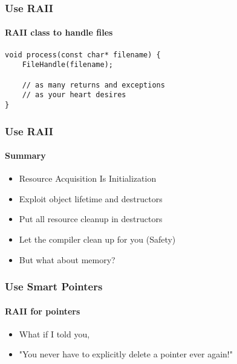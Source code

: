 \begin{frame}[fragile]
    \frametitle{\declarerule Use RAII}
    \framesubtitle{RAII class to handle files}
    \begin{lstlisting}[title=Problems begone!]
void process(const char* filename) {
    FileHandle(filename);

    // as many returns and exceptions
    // as your heart desires
}
    \end{lstlisting}
\end{frame}

\begin{frame}
    \frametitle{\declarerule Use RAII}
    \framesubtitle{Summary}
    \begin{itemize}
        \item<1->Resource Acquisition Is Initialization 
        \item<1->Exploit object lifetime and destructors
        \item<1->Put all resource cleanup in destructors
        \item<1->Let the compiler clean up for you (\alert{Safety})
        \item<2->But what about memory?
    \end{itemize}
\end{frame}


\begin{frame}
    \frametitle{\declarerule Use Smart Pointers}
    \framesubtitle{RAII for pointers}
    \begin{itemize}
        \item What if I told you,
        \item "You never have to explicitly delete a pointer ever again!"
    \end{itemize}
\end{frame}




